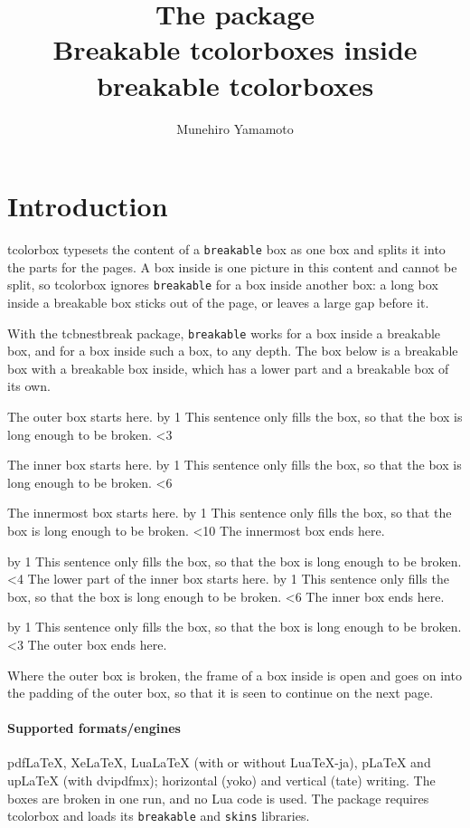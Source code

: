 \documentclass{article}
\title{The \pkg{tcbnestbreak} package\\
  \large Breakable tcolorboxes inside breakable tcolorboxes}
\author{Munehiro Yamamoto}
\date{\tnbversion}
\makeatletter
\newcommand*\pkg[1]{\textsf{#1}}
\newcommand*\key[1]{\texttt{#1}}
\newcommand\filler[1]{%
  \count@=0
  \loop\advance\count@ by 1
    This sentence only fills the box, so that the box is long enough to
    be broken.
  \ifnum\count@<#1 \repeat}
\makeatother
\begin{document}
\maketitle

\section{Introduction}

\pkg{tcolorbox} typesets the content of a \key{breakable} box as one
box and splits it into the parts for the pages.  A box inside is one
picture in this content and cannot be split, so \pkg{tcolorbox}
ignores \key{breakable} for a box inside another box: a long box
inside a breakable box sticks out of the page, or leaves a large gap
before it.

With the \pkg{tcbnestbreak} package, \key{breakable} works for a box
inside a breakable box, and for a box inside such a box, to any depth.
The box below is a breakable box with a breakable box inside, which
has a lower part and a breakable box of its own.

\begin{tcolorbox}[breakable, title=A breakable box]
The outer box starts here.  \filler{3}

\begin{tcolorbox}[breakable, colback=yellow!15, colframe=blue!50!black,
  title=A breakable box inside]
The inner box starts here.  \filler{6}
\begin{tcolorbox}[breakable, colback=red!8, colframe=red!50!black,
  title=A breakable box inside the inner box]
The innermost box starts here.  \filler{10}
The innermost box ends here.
\end{tcolorbox}
\filler{4}
\tcblower
The lower part of the inner box starts here.  \filler{6}
The inner box ends here.
\end{tcolorbox}

\filler{3}  The outer box ends here.
\end{tcolorbox}

\noindent
Where the outer box is broken, the frame of a box inside is open and
goes on into the padding of the outer box, so that it is seen to
continue on the next page.

\paragraph{Supported formats/engines}
pdf\LaTeX, Xe\LaTeX, Lua\LaTeX{} (with or without Lua\TeX-ja),
p\LaTeX{} and up\LaTeX{} (with dvipdfmx); horizontal (yoko) and
vertical (tate) writing.  The boxes are broken in one run, and no Lua
code is used.  The package requires \pkg{tcolorbox} and loads its
\texttt{breakable} and \texttt{skins} libraries.
\end{document}
